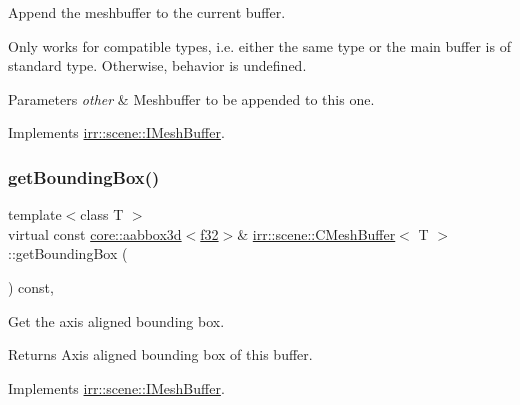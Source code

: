 Append the meshbuffer to the current buffer. 

Only works for compatible types, i.\+e. either the same type or the main buffer is of standard type. Otherwise, behavior is undefined. 
\begin{DoxyParams}{Parameters}
{\em other} & Meshbuffer to be appended to this one. \\
\hline
\end{DoxyParams}


Implements \hyperlink{classirr_1_1scene_1_1IMeshBuffer_a79d2737962579138183ed0fd324310b3}{irr\+::scene\+::\+I\+Mesh\+Buffer}.

\mbox{\label{classirr_1_1scene_1_1CMeshBuffer_a759863b44c024f79747019f492a5c7cf}} 
\subsubsection{\texorpdfstring{get\+Bounding\+Box()}{getBoundingBox()}\hspace{0.1cm}{\footnotesize\ttfamily [1/2]}}
{\footnotesize\ttfamily template$<$class T $>$ \\
virtual const \hyperlink{classirr_1_1core_1_1aabbox3d}{core\+::aabbox3d}$<$\hyperlink{namespaceirr_a0277be98d67dc26ff93b1a6a1d086b07}{f32}$>$\& \hyperlink{classirr_1_1scene_1_1CMeshBuffer}{irr\+::scene\+::\+C\+Mesh\+Buffer}$<$ T $>$\+::get\+Bounding\+Box (\begin{DoxyParamCaption}{ }\end{DoxyParamCaption}) const\hspace{0.3cm}{\ttfamily [inline]}, {\ttfamily [virtual]}}



Get the axis aligned bounding box. 

\begin{DoxyReturn}{Returns}
Axis aligned bounding box of this buffer. 
\end{DoxyReturn}


Implements \hyperlink{classirr_1_1scene_1_1IMeshBuffer_ac53fe1096756a40f25dae25911e27c51}{irr\+::scene\+::\+I\+Mesh\+Buffer}.

\mbox{\label{classirr_1_1scene_1_1CMeshBuffer_a759863b44c024f79747019f492a5c7cf}} 
